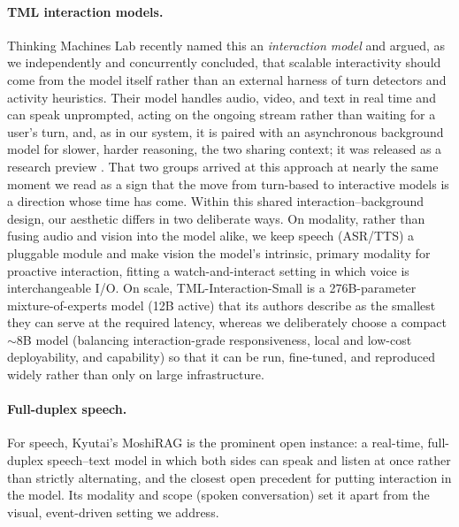 \documentclass{llmxive}
\begin{document}
\paragraph{\textbf{TML interaction models.}} Thinking Machines Lab recently named this an \textit{interaction model} and argued, as we independently and concurrently concluded, that scalable interactivity should come from the model itself rather than an external harness of turn detectors and activity heuristics. Their model handles audio, video, and text in real time and can speak unprompted, acting on the ongoing stream rather than waiting for a user's turn, and, as in our system, it is paired with an asynchronous background model for slower, harder reasoning, the two sharing context; it was released as a research preview \cite{thinkingmachines2026interactionmodels}. That two groups arrived at this approach at nearly the same moment we read as a sign that the move from turn-based to interactive models is a direction whose time has come. Within this shared interaction--background design, our aesthetic differs in two deliberate ways. On modality, rather than fusing audio and vision into the model alike, we keep speech (ASR/TTS) a pluggable module and make vision the model's intrinsic, primary modality for proactive interaction, fitting a watch-and-interact setting in which voice is interchangeable I/O. On scale, TML-Interaction-Small is a 276B-parameter mixture-of-experts model (12B active) that its authors describe as the smallest they can serve at the required latency, whereas we deliberately choose a compact $\sim$8B model (balancing interaction-grade responsiveness, local and low-cost deployability, and capability) so that it can be run, fine-tuned, and reproduced widely rather than only on large infrastructure.
\paragraph{\textbf{Full-duplex speech.}} For speech, Kyutai's MoshiRAG \cite{chien2026moshiragasynchronousknowledgeretrieval} is the prominent open instance: a real-time, full-duplex speech--text model in which both sides can speak and listen at once rather than strictly alternating, and the closest open precedent for putting interaction in the model. Its modality and scope (spoken conversation) set it apart from the visual, event-driven setting we address.
\end{document}
